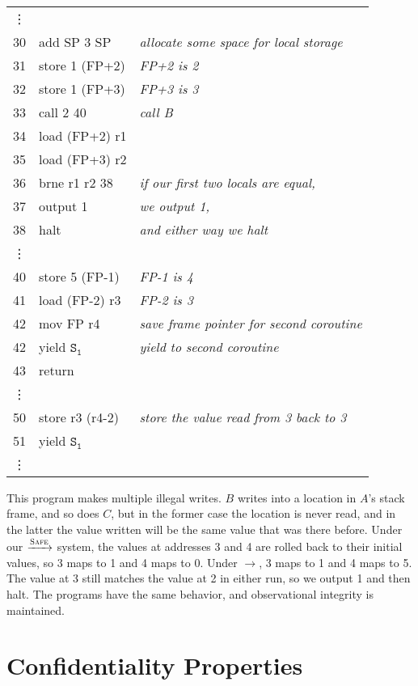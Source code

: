 \documentclass{article}
\begin{document}
    {\tt
    \begin{tabular}{l l | l}
      \vdots \\
      30 & add SP 3 SP & {\it allocate some space for local storage} \\
      31 & store 1 (FP+2) & {\it FP+2 is 2} \\
      32 & store 1 (FP+3) & {\it FP+3 is 3} \\
      33 & call 2 40 & {\it call B} \\
      34 & load (FP+2) r1 & \\
      35 & load (FP+3) r2 & \\
      36 & brne r1 r2 38 & {\it if our first two locals are equal,} \\
      37 & output 1 & {\it we output 1,} \\
      38 & halt & {\it and either way we halt} \\
      \vdots \\
      40 & store 5 (FP-1) & {\it FP-1 is 4} \\
      41 & load (FP-2) r3 & {\it FP-2 is 3} \\
      42 & mov FP r4 & {\it save frame pointer for second coroutine} \\
      42 & yield \(\mathtt{S_1}\) & {\it yield to second coroutine} \\
      43 & return \\
      \vdots \\
      50 & store r3 (r4-2) & {\it store the value read from 3 back to 3} \\
      51 & yield \(\mathtt{S_1}\) & \\
      \vdots
    \end{tabular}}

    This program makes multiple illegal writes. \(B\) writes into a location in \(A\)'s stack frame,
    and so does \(C\), but in the former case the location is never read, and in the latter the value written
    will be the same value that was there before. Under our \(\xrightarrow{\text{\sc Safe}}\) system,
    the values at addresses 3 and 4 are rolled back to their initial values, so 3 maps to 1 and 4 maps
    to 0. Under \(\longrightarrow\), 3 maps to 1 and 4 maps to 5. The value at 3 still matches the value
    at 2 in either run, so we output 1 and then halt. The programs have the same behavior, and observational
    integrity is maintained.

  \section{Confidentiality Properties}
    \label{sec:propcon}
\end{document}

